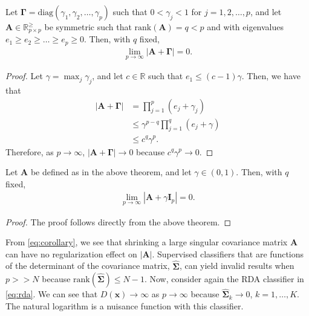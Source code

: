 \documentclass[11pt]{article}
\begin{document}
\begin{thm}
Let $\bm \Gamma = \text{diag}(\gamma_1, \gamma_2, \ldots, \gamma_p)$ such that $0 < \gamma_j < 1$ for $j = 1, 2, \ldots, p$, and let $\bm A \in \mathbb{R}_{p \times p}^{\ge}$ be symmetric such that $\text{rank}(\bm A) = q < p$ and with eigenvalues $e_1 \ge e_2 \ge \ldots \ge e_p \ge 0$. Then, with $q$ fixed,
\begin{align*}
	\lim_{p \rightarrow \infty} |\bm A + \bm \Gamma| = 0.
\end{align*}
\end{thm}
\begin{proof}
Let $\gamma = \max_j \gamma_j$, and let $c \in \mathbb{R}$ such that $e_1 \le (c - 1) \gamma$. Then, we have that 
	\begin{align*}
		|\bm A + \bm \Gamma| &= \prod_{j = 1}^p (e_j + \gamma_j)\\
		&\le \gamma^{p-q} \prod_{j=1}^q (e_j + \gamma)\\
		&\le c^q\gamma^p.
	\end{align*}
Therefore, as $p \rightarrow \infty$, $|\bm A + \bm \Gamma| \rightarrow 0$ because $c^q\gamma^p \rightarrow 0$.


\end{proof}

\begin{cor}
	 Let $\bm A$ be defined as in the above theorem, and let $\gamma \in (0,1)$. Then, with $q$ fixed,
\begin{align}
	\lim_{p \rightarrow \infty} |\bm A + \gamma \bm I_p| = 0.\label{eq:corollary}
\end{align}
\end{cor}
\begin{proof}
The proof follows directly from the above theorem.
\end{proof}

From \eqref{eq:corollary}, we see that shrinking a large singular covariance matrix $\bm A$ can have no regularization effect on $|\bm A|$.  Supervised classifiers that are functions of the determinant of the covariance matrix, $\widehat{\bm \Sigma}$, can yield invalid results when $p >> N$ because $\text{rank}(\widehat{\bm \Sigma}) \le N - 1$. Now, consider again the RDA classifier in \eqref{eq:rda}. We can see that $D(\bm x) \rightarrow \infty$ as $p \rightarrow \infty$ because $\widehat{\bm\Sigma}_k \rightarrow 0$, $k = 1, \ldots, K$. The natural logarithm is a nuisance function with this classifier. 
\end{document}
